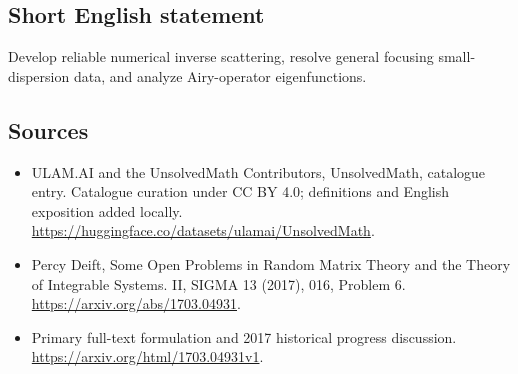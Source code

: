 \documentclass[11pt]{article}
\begin{document}
\subsection{Short English statement}
Develop reliable numerical inverse scattering, resolve general focusing small-dispersion data, and analyze Airy-operator eigenfunctions.
\subsection{Sources}
\begin{itemize}
\item[\hypertarget{source:statement:1}{S1}] ULAM.AI and the UnsolvedMath Contributors, UnsolvedMath, catalogue entry. Catalogue curation under CC BY 4.0; definitions and English exposition added locally.
\url{https://huggingface.co/datasets/ulamai/UnsolvedMath}.
\item[\hypertarget{source:statement:2}{S2}] Percy Deift, Some Open Problems in Random Matrix Theory and the Theory of Integrable Systems. II, SIGMA 13 (2017), 016, Problem 6.
\url{https://arxiv.org/abs/1703.04931}.
\item[\hypertarget{source:statement:3}{S3}] Primary full-text formulation and 2017 historical progress discussion.
\url{https://arxiv.org/html/1703.04931v1}.
\end{itemize}
\label{end:statement}
\end{document}
